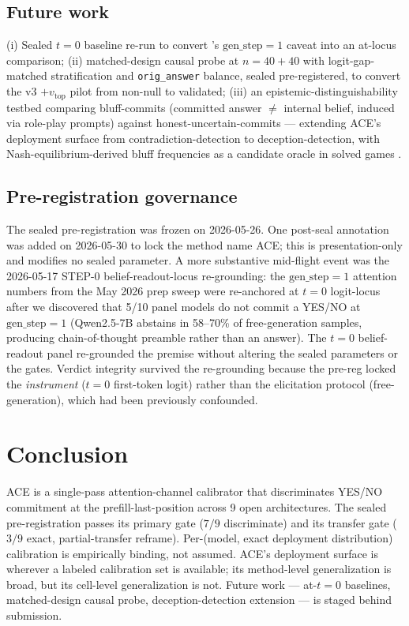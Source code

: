 \documentclass[10pt, letterpaper]{article}
\begin{document}
\subsection{Future work}
\label{sec:discussion:future}

(i) Sealed $t{=}0$ baseline re-run to convert
's $\text{gen\_step}{=}1$ caveat into an
at-locus comparison; (ii) matched-design causal probe at $n{=}40{+}40$
with logit-gap-matched stratification and \texttt{orig\_answer}
balance, sealed pre-registered, to convert the v3 $+v_\text{top}$
pilot from non-null to validated; (iii) an epistemic-distinguishability
testbed comparing bluff-commits (committed answer $\neq$ internal
belief, induced via role-play prompts) against
honest-uncertain-commits --- extending ACE's deployment surface from
contradiction-detection to deception-detection, with
Nash-equilibrium-derived bluff frequencies as a candidate oracle in
solved games \citep{brown2017libratus, brown2019pluribus}.

\subsection{Pre-registration governance}

The sealed pre-registration was frozen on 2026-05-26. One post-seal
annotation was added on 2026-05-30 to lock the method name ACE; this
is presentation-only and modifies no sealed parameter. A more
substantive mid-flight event was the 2026-05-17 STEP-0
belief-readout-locus re-grounding: the $\text{gen\_step}{=}1$
attention numbers from the May 2026 prep sweep were re-anchored at
$t{=}0$ logit-locus after we discovered that 5/10 panel models do
not commit a YES/NO at $\text{gen\_step}{=}1$ (Qwen2.5-7B abstains
in 58--70\% of free-generation samples, producing chain-of-thought
preamble rather than an answer). The $t{=}0$ belief-readout panel
re-grounded the premise without altering the sealed parameters or
the gates. Verdict integrity survived the re-grounding because the
pre-reg locked the \emph{instrument} ($t{=}0$ first-token logit)
rather than the elicitation protocol (free-generation), which had
been previously confounded.

\section{Conclusion}
\label{sec:conclusion}

ACE is a single-pass attention-channel calibrator that discriminates
YES/NO commitment at the prefill-last-position across 9 open
architectures. The sealed pre-registration passes its primary gate
($7/9$ discriminate) and its transfer gate ($3/9$ exact,
partial-transfer reframe). Per-(model, exact deployment distribution)
calibration is empirically binding, not assumed. ACE's deployment
surface is wherever a labeled calibration set is available; its
method-level generalization is broad, but its cell-level
generalization is not. Future work --- at-$t{=}0$ baselines,
matched-design causal probe, deception-detection extension --- is
staged behind submission.
\end{document}
